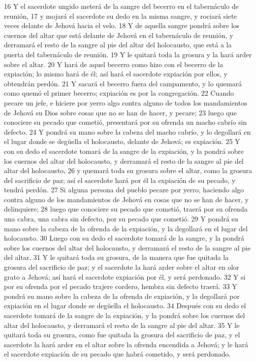 16 Y el sacerdote ungido meterá de la sangre del becerro en el tabernáculo de reunión,
17 y mojará el sacerdote su dedo en la misma sangre, y rociará siete veces delante de Jehová hacia el velo.
18 Y de aquella sangre pondrá sobre los cuernos del altar que está delante de Jehová en el tabernáculo de reunión, y derramará el resto de la sangre al pie del altar del holocausto, que está a la puerta del tabernáculo de reunión.
19 Y le quitará toda la grosura y la hará arder sobre el altar.
20 Y hará de aquel becerro como hizo con el becerro de la expiación; lo mismo hará de él; así hará el sacerdote expiación por ellos, y obtendrán perdón.
21 Y sacará el becerro fuera del campamento, y lo quemará como quemó el primer becerro; expiación es por la congregación.
22 Cuando pecare un jefe, e hiciere por yerro algo contra alguno de todos los mandamientos de Jehová su Dios sobre cosas que no se han de hacer, y pecare;
23 luego que conociere su pecado que cometió, presentará por su ofrenda un macho cabrío sin defecto.
24 Y pondrá su mano sobre la cabeza del macho cabrío, y lo degollará en el lugar donde se degüella el holocausto, delante de Jehová; es expiación.
25 Y con su dedo el sacerdote tomará de la sangre de la expiación, y la pondrá sobre los cuernos del altar del holocausto, y derramará el resto de la sangre al pie del altar del holocausto,
26 y quemará toda su grosura sobre el altar, como la grosura del sacrificio de paz; así el sacerdote hará por él la expiación de su pecado, y tendrá perdón.
27 Si alguna persona del pueblo pecare por yerro, haciendo algo contra alguno de los mandamientos de Jehová en cosas que no se han de hacer, y delinquiere;
28 luego que conociere su pecado que cometió, traerá por su ofrenda una cabra, una cabra sin defecto, por su pecado que cometió.
29 Y pondrá su mano sobre la cabeza de la ofrenda de la expiación, y la degollará en el lugar del holocausto.
30 Luego con su dedo el sacerdote tomará de la sangre, y la pondrá sobre los cuernos del altar del holocausto, y derramará el resto de la sangre al pie del altar.
31 Y le quitará toda su grosura, de la manera que fue quitada la grosura del sacrificio de paz; y el sacerdote la hará arder sobre el altar en olor grato a Jehová; así hará el sacerdote expiación por él, y será perdonado.
32 Y si por su ofrenda por el pecado trajere cordero, hembra sin defecto traerá.
33 Y pondrá su mano sobre la cabeza de la ofrenda de expiación, y la degollará por expiación en el lugar donde se degüella el holocausto.
34 Después con su dedo el sacerdote tomará de la sangre de la expiación, y la pondrá sobre los cuernos del altar del holocausto, y derramará el resto de la sangre al pie del altar.
35 Y le quitará toda su grosura, como fue quitada la grosura del sacrificio de paz, y el sacerdote la hará arder en el altar sobre la ofrenda encendida a Jehová; y le hará el sacerdote expiación de su pecado que habrá cometido, y será perdonado.

